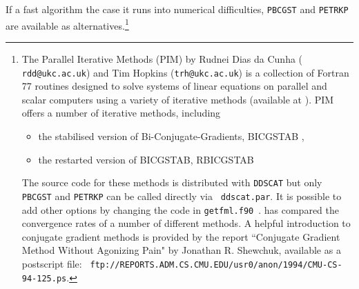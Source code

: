 If a fast algorithm the case it runs into numerical difficulties, {\tt PBCGST} and
{\tt PETRKP} are available as alternatives.\footnote{
The Parallel Iterative Methods (PIM) by Rudnei Dias da Cunha ({\tt
rdd@ukc.ac.uk}) and Tim Hopkins ({\tt trh@ukc.ac.uk}) is a collection
of Fortran 77 routines designed to solve systems of linear equations
on parallel and scalar computers using a variety of iterative methods
(available at \hfill{}).
PIM offers a number of iterative methods, including
\begin{itemize}
\item the stabilised version of Bi-Conjugate-Gradients, BICGSTAB 
\citep{van_der_Vorst_1992},
\item the restarted version of BICGSTAB, RBICGSTAB 
\citet{Sleijpen+Fokkema_1993} 
\end{itemize}
The source code for these methods is distributed with {\tt DDSCAT} but
only {\tt PBCGST} and {\tt PETRKP} can be called directly via {\tt
ddscat.par}. It is possible to add other options by
changing the code in {\tt getfml.f90}~. \citet{Flatau_1997} has compared
the convergence rates of a number of different methods.
A helpful introduction to
conjugate gradient methods is provided by the report ``Conjugate
Gradient Method Without Agonizing Pain" by Jonathan R. Shewchuk,
available as a postscript file: {\tt
   ftp://REPORTS.ADM.CS.CMU.EDU/usr0/anon/1994/CMU-CS-94-125.ps}.
}

